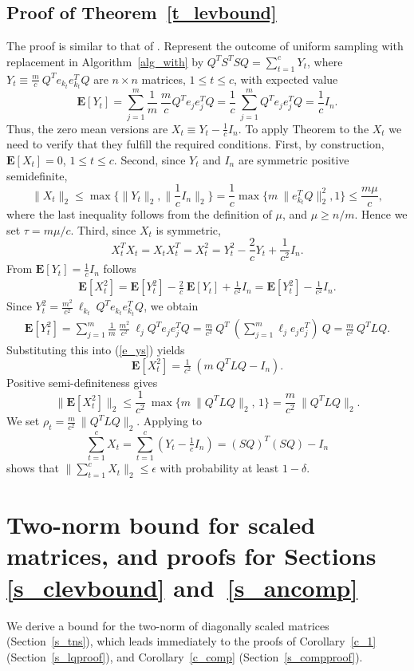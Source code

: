 \documentclass{siamltex}
\begin{document}
\subsection{Proof of Theorem~\ref{t_levbound}}\label{s_tlevproof}
The proof is similar to that of \cite[Lemma 3]{BalzRN11}. 
Represent the outcome of uniform sampling with 
replacement in Algorithm~\ref{alg_with} by
$Q^TS^TSQ=\sum_{t=1}^c{Y_t}$, where
$Y_t\equiv \frac{m}{c}\>Q^Te_{k_t}e_{k_t}^TQ$ are $n\times n$ matrices, 
$1\leq t\leq c$, with expected value
$${\mathbf{E}}[Y_t]=\sum_{j=1}^m{\frac{1}{m}\>\frac{m}{c} Q^Te_je_j^TQ}
=\frac{1}{c}\>\sum_{j=1}^m{Q^Te_je_j^TQ}=\frac{1}{c} I_n.$$
Thus, the zero mean versions are
$X_t\equiv Y_t-\tfrac{1}{c}I_n$.
To apply Theorem \cite[Theorem 4]{Recht11} to the $X_t$ we need to verify 
that they
fulfill the required conditions. 
First, by construction, ${\mathbf{E}}[X_t]=0$, $1\leq t\leq c$. Second,
since $Y_t$ and $I_n$ are symmetric positive semidefinite,
$$\|X_t\|_2\leq \max\{\|Y_t\|_2, \|\frac{1}{c}I_n\|_2\}=
\frac{1}{c}\max\{m\>\|e_{k_t}^TQ\|_2^2,1\}\leq \frac{m\mu}{c},$$
where the last inequality follows from the definition of $\mu$, and 
$\mu\geq n/m$. Hence we set $\tau=m\mu/c$.
Third, since $X_t$ is symmetric,
$$X_t^TX_t=X_tX_t^T=X_t^2=Y_t^2 -\frac{2}{c} Y_t+\frac{1}{c^2}I_n.$$
From ${\mathbf{E}}[Y_t]=\tfrac{1}{c} I_n$ follows
\begin{eqnarray}\label{e_ys}
{\mathbf{E}}[X_t^2]={\mathbf{E}}[Y_t^2]-\frac{2}{c}\>{\mathbf{E}}[Y_t]+\frac{1}{c^2}I_n=
{\mathbf{E}}[Y_t^2]-\frac{1}{c^2}I_n.
\end{eqnarray}
Since $Y_t^2=\tfrac{m^2}{c^2}\>\ell_{k_t}\>Q^Te_{k_t}e_{k_t}^TQ$, we obtain
\begin{eqnarray*}
{\mathbf{E}}[Y_t^2]=\sum_{j=1}^m{\frac{1}{m}\> \frac{m^2}{c^2}\>\ell_j Q^Te_je_j^TQ}
=\frac{m}{c^2}\>Q^T \> \left(\sum_{j=1}^m{\ell_je_je_j^T}\right)\>Q
= \frac{m}{c^2}\> Q^TLQ.
\end{eqnarray*}
Substituting this into (\ref{e_ys}) yields
$${\mathbf{E}}[X_t^2]=\tfrac{1}{c^2} \> \left(m\> Q^TLQ - I_n\right).$$
Positive semi-definiteness gives
$$\|{\mathbf{E}}[X_t^2]\|_2\leq \frac{1}{c^2}\>\max\{m\>\|Q^TLQ\|_2,\, 1\}=
\frac{m}{c^2}\>\|Q^TLQ\|_2.$$
We set $\rho_t=\tfrac{m}{c^2}\> \|Q^TLQ\|_2$.
Applying \cite[Theorem 4]{Recht11}  to
$$\sum_{t=1}^c{X_t}=\sum_{t=1}^c{\left(Y_t-\tfrac{1}{c}I_n\right)}=
(SQ)^T(SQ)- I_n$$
shows that
$\|\sum_{t=1}^c{X_t}\|_2\leq \epsilon$ with probability at least
$1-\delta$. 

 

\section{Two-norm bound for scaled matrices, and proofs
for Sections \ref{s_clevbound} and~\ref{s_ancomp}}\label{s_app2}
We derive a bound for the two-norm of diagonally scaled matrices
(Section~\ref{s_tns}),
which leads immediately to the proofs
of Corollary~\ref{c_1} (Section~\ref{s_lqproof}), and
Corollary~\ref{c_comp} (Section~\ref{s_compproof}).
\end{document}
